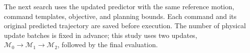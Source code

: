 \documentclass[letterpaper, 10 pt, conference]{ieeeconf}
\begin{document}
The next search uses the updated predictor with the same reference
motion, command templates, objective, and planning bounds. Each
command and its original predicted trajectory are saved before
execution. The number of physical update batches is fixed in
advance; this study uses two updates,
$\mathcal M_0\rightarrow\mathcal M_1\rightarrow\mathcal M_2$,
followed by the final evaluation.



\end{document}
